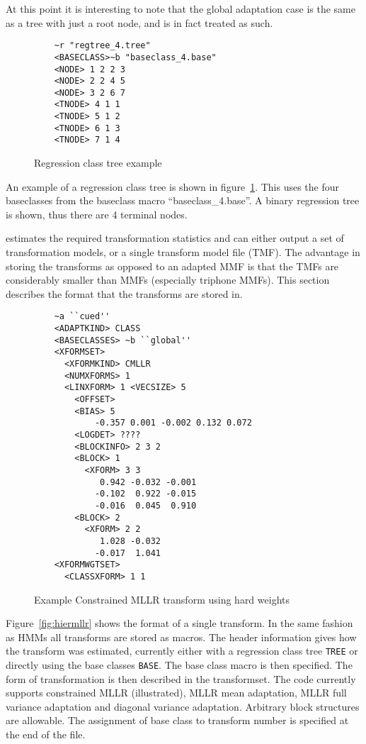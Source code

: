 At this point it is interesting to note that the global adaptation
case is the same as a tree with just a root node, and is in fact
treated as such.

\begin{center}
\begin{figure}
\begin{verbatim}
    ~r "regtree_4.tree"
    <BASECLASS>~b "baseclass_4.base"
    <NODE> 1 2 2 3 
    <NODE> 2 2 4 5 
    <NODE> 3 2 6 7 
    <TNODE> 4 1 1
    <TNODE> 5 1 2
    <TNODE> 6 1 3
    <TNODE> 7 1 4
\end{verbatim}
\caption{Regression class tree example}
\label{fig:regtree}
\end{figure}
\end{center}
An example of a regression class tree is shown in figure~\ref{fig:regtree}.
This uses the four baseclasses from the baseclass macro ``baseclass\_4.base''.
A binary regression tree is shown, thus there are 4 terminal nodes. 


 estimates the required transformation statistics and can
either output a set of transformation models, or a single transform
model file (TMF). The advantage
in storing the transforms as opposed to an adapted MMF is that the
TMFs are considerably smaller than MMFs (especially triphone
MMFs). This section describes the format that the transforms are 
stored in.

\noindent

\begin{figure}[htbp]
\begin{verbatim}
    ~a ``cued''
    <ADAPTKIND> CLASS
    <BASECLASSES> ~b ``global''
    <XFORMSET>  
      <XFORMKIND> CMLLR
      <NUMXFORMS> 1
      <LINXFORM> 1 <VECSIZE> 5
        <OFFSET> 
        <BIAS> 5
            -0.357 0.001 -0.002 0.132 0.072
        <LOGDET> ????
        <BLOCKINFO> 2 3 2
        <BLOCK> 1
          <XFORM> 3 3
             0.942 -0.032 -0.001
            -0.102  0.922 -0.015
            -0.016  0.045  0.910
        <BLOCK> 2
          <XFORM> 2 2
             1.028 -0.032
            -0.017  1.041 
    <XFORMWGTSET>
      <CLASSXFORM> 1 1
\end{verbatim}
\caption{Example Constrained MLLR transform using hard weights}
\end{figure}
Figure~\ref{fig:hiermllr} shows the format of a single transform. In
the same fashion as HMMs all transforms are stored as macros. The
header information gives how the transform was estimated, currently
either with a regression class tree {\tt TREE} or directly using the
base classes {\tt BASE}. The base class macro is then specified. The
form of transformation is then described in the transformset. The code
currently supports constrained MLLR (illustrated), MLLR mean
adaptation, MLLR full variance adaptation and diagonal variance
adaptation.  Arbitrary block structures are allowable.  The assignment
of base class to transform number is specified at the end of the file.

